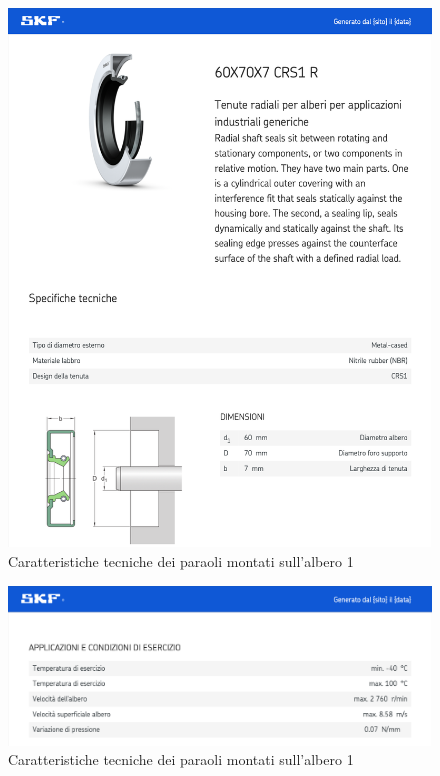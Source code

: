 \begin{figure}[h]
    \centering
    \includegraphics[scale=0.5]{Immagini/Paraolio1Albero1.png}
    \caption{Caratteristiche tecniche dei paraoli montati sull'albero 1}
    \label{fig:Paraolio1Albero1}
\end{figure}
\newpage
\begin{figure}[h]
    \centering
    \includegraphics[scale=0.5]{Immagini/Paraolio2Albero1.png}
    \caption{Caratteristiche tecniche dei paraoli montati sull'albero 1}
    \label{fig:Paraolio2Albero1}
\end{figure}

